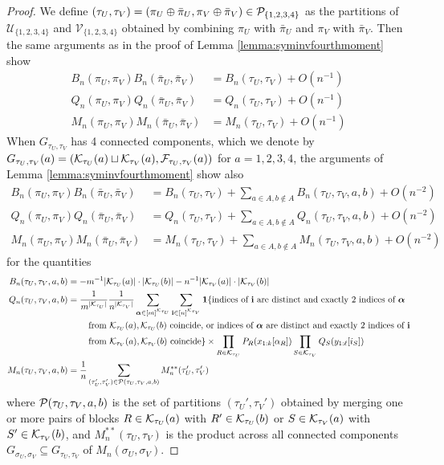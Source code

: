 \documentclass[10pt,reqno]{amsart}
\def\cU{\mathcal{U}}
\def\cV{\mathcal{V}}
\def\1{\mathbf{1}}
\def\bi{\mathbf{i}}
\begin{document}
\begin{proof}
We define $(\tau_U,\tau_V)=(\pi_U \oplus \bar\pi_U,\pi_V \oplus \bar\pi_V)
\in \mathcal{P}_{\{1,2,3,4\}}$ as the partitions of $\cU_{\{1,2,3,4\}}$ and
$\cV_{\{1,2,3,4\}}$ obtained by combining $\pi_U$ with $\bar\pi_U$
and $\pi_V$ with $\bar\pi_V$. Then the same
arguments as in the proof of Lemma \ref{lemma:syminvfourthmoment} show
\begin{align*}
B_n(\pi_U,\pi_V)B_n(\bar\pi_U,\bar\pi_V)&=B_n(\tau_U,\tau_V)+O(n^{-1})\\
Q_n(\pi_U,\pi_V)Q_n(\bar\pi_U,\bar\pi_V)&=Q_n(\tau_U,\tau_V)+O(n^{-1})\\
M_n(\pi_U,\pi_V)M_n(\bar\pi_U,\bar\pi_V)&=M_n(\tau_U,\tau_V)+O(n^{-1})
\end{align*}
When $G_{\tau_U,\tau_V}$ has 4 connected components, which we denote by
$G_{\tau_U,\tau_V}(a)=(\mathcal{K}_{\tau_U}(a) \sqcup
\mathcal{K}_{\tau_V}(a),\mathcal{F}_{\tau_U,\tau_V}(a))$ for $a=1,2,3,4$,
the arguments of Lemma \ref{lemma:syminvfourthmoment} show also
\begin{align*}
B_n(\pi_U,\pi_V)B_n(\bar\pi_U,\bar\pi_V)&=B_n(\tau_U,\tau_V)
+\sum_{a \in A,b \notin A} B_n(\tau_U,\tau_V,a,b)+O(n^{-2})\\
Q_n(\pi_U,\pi_V)Q_n(\bar\pi_U,\bar\pi_V)&=Q_n(\tau_U,\tau_V)
+\sum_{a \in A,b \notin A} Q_n(\tau_U,\tau_V,a,b)+O(n^{-2})\\
M_n(\pi_U,\pi_V)M_n(\bar\pi_U,\bar\pi_V)&=M_n(\tau_U,\tau_V)
+\sum_{a \in A,b \notin A} M_n(\tau_U,\tau_V,a,b)+O(n^{-2})
\end{align*}
for the quantities
\begin{align*}
B_n(\tau_U,\tau_V,a,b)&=-m^{-1}|\cK_{\tau_U}(a)| \cdot |\cK_{\tau_U}(b)|
-n^{-1}|\cK_{\tau_V}(a)| \cdot |\cK_{\tau_V}(b)|\\
Q_n(\tau_U,\tau_V,a,b)&=\frac{1}{m^{|\cK_{\tau_U}|}}
\frac{1}{n^{|\cK_{\tau_V}|}} \sum_{\balpha \in [m]^{\cK_{\tau_U}}}
\sum_{\bi \in [n]^{\cK_{\tau_V}}} \1\{\text{indices of } \bi \text{ are
distinct and exactly 2 indices of } \balpha\\
&\qquad \text{ from } \cK_{\tau_U}(a),\cK_{\tau_U}(b) \text{ coincide, or
indices of } \balpha \text{ are distinct and exactly 2 indices of } \bi\\
&\qquad \text{ from } \cK_{\tau_V}(a),\cK_{\tau_V}(b) \text{ coincide}\}
\times \prod_{R \in \cK_{\tau_U}} P_R(x_{1:k}[\alpha_R])
\prod_{S \in \cK_{\tau_V}} Q_S(y_{1:\ell}[i_S])\\
M_n(\tau_U,\tau_V,a,b)&=\frac{1}{n}\sum_{(\tau_U',\tau_V') \in
\cP(\tau_U,\tau_V,a,b)} M_n^{**}(\tau_U',\tau_V')
\end{align*}
where $\mathcal{P}(\tau_U,\tau_V,a,b)$ is the set of partitions $(\tau_U',\tau_V')$
obtained by merging one or more pairs of blocks
$R \in \mathcal{K}_{\tau_U}(a)$ with $R' \in \mathcal{K}_{\tau_U}(b)$
or $S \in \mathcal{K}_{\tau_V}(a)$ with $S' \in \mathcal{K}_{\tau_V}(b)$,
and $M_n^{**}(\tau_U,\tau_V)$ is the product across all
connected components $G_{\sigma_U,\sigma_V} \subseteq G_{\tau_U,\tau_V}$ of
$M_n(\sigma_U,\sigma_V)$.


\end{proof}
\end{document}

